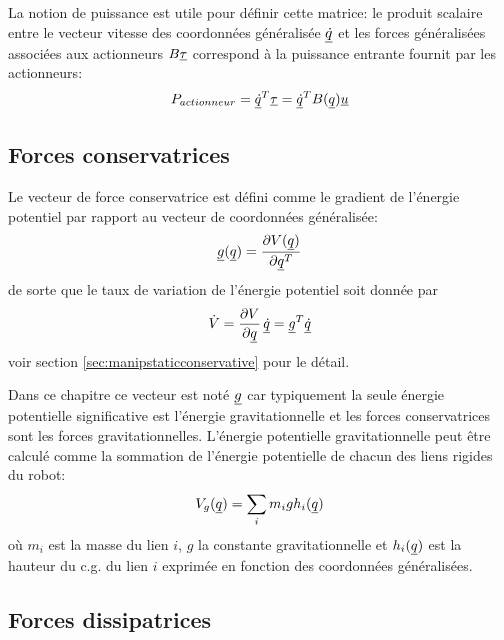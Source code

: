 La notion de puissance est utile pour définir cette matrice: le produit scalaire entre le vecteur vitesse des coordonnées généralisée $\underline{\dot{q}}$ et les forces généralisées associées aux actionneurs $B\underline{\tau}$ correspond à la puissance entrante fournit par les actionneurs:
\begin{align}
P_{actionneur} = \underline{\dot{q}}^T \underline{\tau} = \underline{\dot{q}}^T B(\underline{q}) \underline{u}
\end{align}


\subsection{Forces conservatrices}

Le vecteur de force conservatrice est défini comme le gradient de l'énergie potentiel par rapport au vecteur de coordonnées généralisée:
\begin{align}
 \underline{g} ( \underline{q} ) = 
\frac{ \partial V(\underline{q} ) }{\partial \underline{q}^T } 
\end{align}
de sorte que le taux de variation de l'énergie potentiel soit donnée par
\begin{align}
\dot{V} = \frac{\partial V}{ \partial \underline{q}} \, \underline{\dot{q}} =  \underline{g}^T \underline{\dot{q}}
\end{align}
voir section \ref{sec:manipstaticconservative} pour le détail. 

Dans ce chapitre ce vecteur est noté $\underline{g}$ car typiquement la seule énergie potentielle significative est l'énergie gravitationnelle et les forces conservatrices sont les forces gravitationnelles. L'énergie potentielle gravitationnelle peut être calculé comme la sommation de l'énergie potentielle de chacun des liens rigides du robot:
\begin{align}
V_g(\underline{q}) = \sum_i m_i g h_i(\underline{q})
\end{align}
où $m_i$ est la masse du lien $i$, $g$ la constante gravitationnelle et $h_i(\underline{q})$ est la hauteur du c.g. du lien $i$ exprimée en fonction des coordonnées généralisées.

\subsection{Forces dissipatrices}



